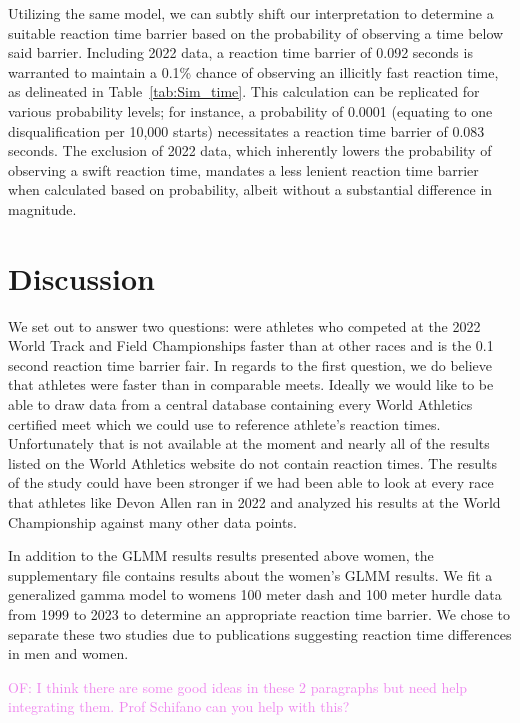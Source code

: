 \documentclass[12pt, letterpaper]{article}
\newcommand{\of}[1]{\textcolor{violet}{OF: #1}}
\begin{document}
Utilizing the same model, we can subtly shift our interpretation to determine a
suitable reaction time barrier based on the probability of observing a time
below said barrier. Including 2022 data, a reaction time barrier of 0.092
seconds is warranted to maintain a 0.1\% chance of observing an illicitly fast
reaction time, as delineated in Table~\ref{tab:Sim_time}. This calculation can
be replicated for various probability levels; for instance, a probability of
0.0001 (equating to one disqualification per 10,000 starts) necessitates a
reaction time barrier of 0.083 seconds. The exclusion of 2022 data, which
inherently lowers the probability of observing a swift reaction time, mandates a
less lenient reaction time barrier when calculated based on probability, albeit
without a substantial difference in magnitude.


\section{Discussion}\label{sec:concludingremarks}

We set out to answer two questions: were athletes who competed at the 2022 World
Track and Field Championships faster than at other races and is the 0.1 second
reaction time barrier fair.  In regards to the first question, we do believe
that athletes were faster than in comparable meets.  Ideally we would like to
be able to draw data from a central database containing every World Athletics
certified meet which we could use to reference athlete's reaction times.
Unfortunately that is not available at the moment and nearly all of the results
listed on the World Athletics website do not contain reaction times.  The results
of the study could have been stronger if we had been able to look at every race
that athletes like Devon Allen ran in 2022 and analyzed his results at the World
Championship against many other data points.

In addition to the GLMM results results presented above women, the supplementary
file contains results about the women's GLMM results.  We fit a generalized
gamma model to womens 100 meter dash and 100 meter hurdle data from 1999 to 2023
to determine an appropriate reaction time barrier.  We chose to separate these
two studies due to publications suggesting reaction time differences in men and
women.

\of{I think there are some good ideas in these 2 paragraphs but need help
integrating them. Prof Schifano can you help with this?}
\end{document}
